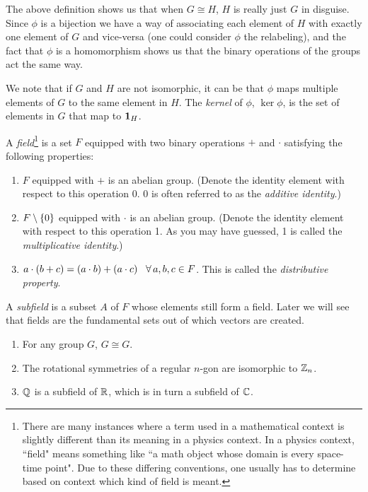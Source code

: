 The above definition shows us that when $G\cong H$, $H$ is really just $G$ in
disguise. Since $\phi$ is a bijection we have a way of associating each element
of $H$ with exactly one element of $G$ and vice-versa (one could consider 
$\phi$ the relabeling), and the fact that $\phi$ is a homomorphism shows us
that the binary operations of the groups act the same way.

We note that if $G$ and $H$ are not isomorphic, it can be that $\phi$ maps
multiple elements of $G$ to the same element in $H$. The {\it
kernel} of $\phi$, $\ker\phi$, is the set of elements in $G$ that map
to ${\mathbf 1}_H$. 


A {\it field}\footnote{There are many instances where a term used in
a mathematical context is slightly different than its meaning in
a physics context. In a physics context, ``field" means something like
``a math object whose domain is every space-time point".
Due to these differing conventions, one usually has to determine based
on context which kind of field is meant.} 
is a set $F$ equipped with two binary
  operations  $+$ and $\cdot$  satisfying the following properties:
  \begin{enumerate}
    \item $F$ equipped with $+$ is an abelian group. (Denote the 
          identity element with respect to this operation 0. 0 is often 
          referred to as the {\it additive identity}.)
    \item $F\setminus\left\{0\right\}$ equipped with $\cdot$ is an abelian group. (Denote the
          identity element with respect to this operation 1. As you may have
          guessed, 1 is called the 
          {\it multiplicative identity}.)
    \item $a\cdot (b+c)=(a\cdot b)+(a\cdot c)\ \ \Forall a,b,c\in F$. This is
          called the {\it distributive property}.
  \end{enumerate}
A {\it subfield} 
is a subset $A$ of $F$ whose elements still form a field.
Later we will see that fields are the fundamental sets out of
which vectors are created.

\begin{example*}{}{}
\begin{enumerate}
  \item For any group $G$, $G\cong G$.
  \item The rotational symmetries of a regular $n$-gon are isomorphic to
        $\mathbb{Z}_n$.
  \item $\mathbb{Q}$ is a subfield of $\mathbb{R}$, which is in turn a subfield of $\mathbb{C}$.
\end{enumerate}
\end{example*}

